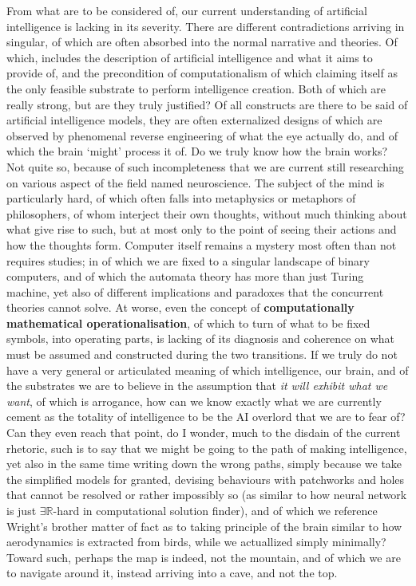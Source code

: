 From what are to be considered of, our current understanding of artificial intelligence is lacking in its severity. There are different contradictions arriving in singular, of which are often absorbed into the normal narrative and theories. Of which, includes the description of artificial intelligence and what it aims to provide of, and the precondition of computationalism of which claiming itself as the only feasible substrate to perform intelligence creation. Both of which are really strong, but are they truly justified? Of all constructs are there to be said of artificial intelligence models, they are often externalized designs of which are observed by phenomenal reverse engineering of what the eye actually do, and of which the brain `might' process it of. Do we truly know how the brain works? Not quite so, because of such incompleteness that we are current still researching on various aspect of the field named neuroscience. The subject of the mind is particularly hard, of which often falls into metaphysics or metaphors of philosophers, of whom interject their own thoughts, without much thinking about what give rise to such, but at most only to the point of seeing their actions and how the thoughts form. Computer itself remains a mystery most often than not requires studies; in of which we are fixed to a singular landscape of binary computers, and of which the automata theory has more than just Turing machine, yet also of different implications and paradoxes that the concurrent theories cannot solve. At worse, even the concept of \textbf{computationally mathematical operationalisation}, of which to turn of what to be fixed symbols, into operating parts, is lacking of its diagnosis and coherence on what must be assumed and constructed during the two transitions. If we truly do not have a very general or articulated meaning of which intelligence, our brain, and of the substrates we are to believe in the assumption that \textit{it will exhibit what we want}, of which is arrogance, how can we know exactly what we are currently cement as the totality of intelligence to be the AI overlord that we are to fear of? Can they even reach that point, do I wonder, much to the disdain of the current rhetoric, such is to say that we might be going to the path of making intelligence, yet also in the same time writing down the wrong paths, simply because we take the simplified models for granted, devising behaviours with patchworks and holes that cannot be resolved or rather impossibly so (as similar to how neural network is just $\exists\mathbb{R}$-hard in computational solution finder), and of which we reference Wright's brother matter of fact as to taking principle of the brain similar to how aerodynamics is extracted from birds, while we actuallized simply minimally? Toward such, perhaps the map is indeed, not the mountain, and of which we are to navigate around it, instead arriving into a cave, and not the top. 


